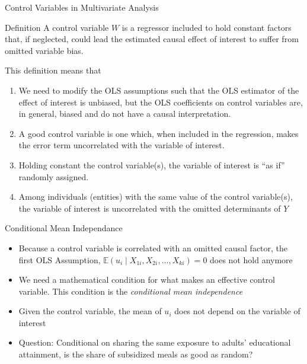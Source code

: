 \documentclass[notes,10pt, aspectratio=169]{beamer}
\begin{document}
\begin{frame}{Control Variables in Multivariate Analysis}
    \begin{exampleblock}{Definition}
        A control variable $W$ is a regressor included to hold constant factors that, if neglected, could lead the estimated causal effect of interest to suffer from omitted variable bias.
    \end{exampleblock}

\vspace{.5cm}    This definition means that

    \begin{enumerate}
        \item We need to modify the OLS assumptions such that the OLS estimator of the effect of interest is unbiased, but the OLS coefficients on control variables are, in general, biased and do not have a causal interpretation.
        \item A good control variable is one which, when included in the regression, makes the error term uncorrelated with the variable of interest.
        \item Holding constant the control variable(s), the variable of interest is ``as if'' randomly assigned.
        \item Among individuals (entities) with the same value of the control variable(s), the variable of interest is uncorrelated with the omitted determinants of $Y$
    \end{enumerate}
\end{frame}





\begin{frame}{Conditional Mean Independance}
\begin{itemize}
    \item Because a control variable is correlated with an omitted causal factor, the first OLS Assumption, $\mathbb{E}(u_i \mid X_{1i}, X_{2i}, \dots, X_{ki})=0$ does not hold anymore
    \item We need a mathematical condition for what makes an effective control variable. This condition is the \textit{conditional mean independence}
    \item Given the control variable, the mean of $u_i$ does not depend on the variable of interest
    \item Question: Conditional on sharing the same exposure to adults' educational attainment, is the share of subsidized meals as good as random?
    
\end{itemize}

\end{frame}
\end{document}
